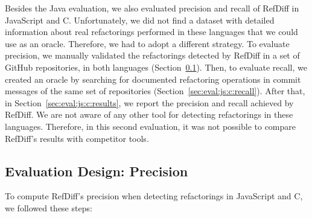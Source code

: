 Besides the Java evaluation, we also evaluated precision and recall of RefDiff in JavaScript and C. Unfortunately, we did not find a dataset with detailed information about real refactorings performed in these languages that we could use as an oracle.
Therefore, we had to adopt a different strategy. 
To evaluate precision, we manually validated the refactorings detected by RefDiff in a set of GitHub repositories, in both languages (Section~\ref{sec:eval:js:c:precision}). Then, to evaluate recall, we created an oracle by searching for documented refactoring operations in commit messages of the same set of repositories (Section~\ref{sec:eval:js:c:recall}).
After that, in Section~\ref{sec:eval:js:c:results}, we report the precision and recall achieved by RefDiff.  We are not aware of any other tool for detecting refactorings in these languages. Therefore, in this second evaluation, it was not possible to compare RefDiff's results with competitor tools.



\subsection{Evaluation Design: Precision}
\label{sec:eval:js:c:precision}


To compute RefDiff's precision when detecting refactorings in JavaScript and C, we followed these steps:

